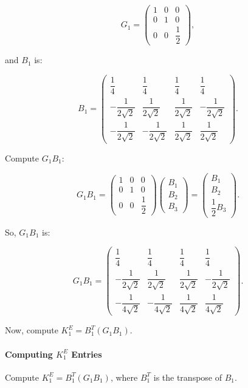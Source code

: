 \documentclass[class=article, crop=false]{standalone}
\begin{document}
\[
G_1 = \begin{pmatrix}
1 & 0 & 0 \\
0 & 1 & 0 \\
0 & 0 & \dfrac{1}{2}
\end{pmatrix},
\]

and $B_1$ is:

\[
B_1 = \begin{pmatrix}
\dfrac{1}{4} & \dfrac{1}{4} & \dfrac{1}{4} & \dfrac{1}{4} \\
- \dfrac{1}{2\sqrt{2}} & \dfrac{1}{2\sqrt{2}} & \dfrac{1}{2\sqrt{2}} & - \dfrac{1}{2\sqrt{2}} \\
- \dfrac{1}{2\sqrt{2}} & - \dfrac{1}{2\sqrt{2}} & \dfrac{1}{2\sqrt{2}} & \dfrac{1}{2\sqrt{2}}
\end{pmatrix}.
\]

Compute $G_1 B_1$:

\[
G_1 B_1 = \begin{pmatrix}
1 & 0 & 0 \\
0 & 1 & 0 \\
0 & 0 & \dfrac{1}{2}
\end{pmatrix} \begin{pmatrix}
B_{1} \\
B_{2} \\
B_{3}
\end{pmatrix} = \begin{pmatrix}
B_{1} \\
B_{2} \\
\dfrac{1}{2} B_{3}
\end{pmatrix}.
\]

So, $G_1 B_1$ is:

\[
G_1 B_1 = \begin{pmatrix}
\dfrac{1}{4} & \dfrac{1}{4} & \dfrac{1}{4} & \dfrac{1}{4} \\
- \dfrac{1}{2\sqrt{2}} & \dfrac{1}{2\sqrt{2}} & \dfrac{1}{2\sqrt{2}} & - \dfrac{1}{2\sqrt{2}} \\
- \dfrac{1}{4\sqrt{2}} & - \dfrac{1}{4\sqrt{2}} & \dfrac{1}{4\sqrt{2}} & \dfrac{1}{4\sqrt{2}}
\end{pmatrix}.
\]

Now, compute $K_1^E = B_1^T (G_1 B_1)$.

\paragraph{Computing $K_1^E$ Entries}

Compute $K_1^E = B_1^T (G_1 B_1)$, where $B_1^T$ is the transpose of $B_1$.
\end{document}
